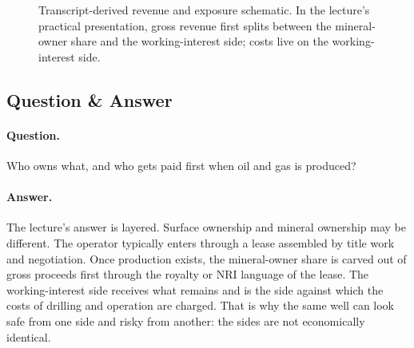 \begin{figure}[h]
\centering
{}
\caption{Transcript-derived revenue and exposure schematic. In the lecture's practical presentation, gross revenue first splits between the mineral-owner share and the working-interest side; costs live on the working-interest side.}
\end{figure}

\subsection{Question \& Answer}

\paragraph{Question.} Who owns what, and who gets paid first when oil and gas is produced?

\paragraph{Answer.} The lecture's answer is layered. Surface ownership and mineral ownership may be different. The operator typically enters through a lease assembled by title work and negotiation. Once production exists, the mineral-owner share is carved out of gross proceeds first through the royalty or NRI language of the lease. The working-interest side receives what remains and is the side against which the costs of drilling and operation are charged. That is why the same well can look safe from one side and risky from another: the sides are not economically identical.


